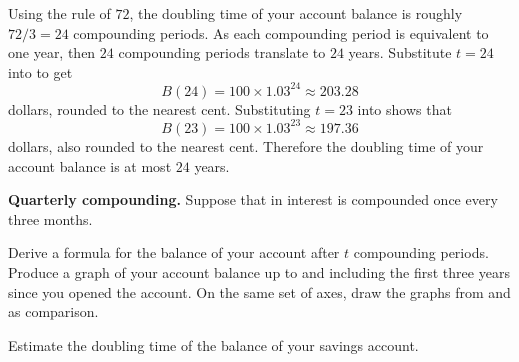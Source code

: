 \documentclass[a4paper,oneside,12pt]{article}
\begin{document}
{\begin{solution}
Using the rule of $72$, the doubling time of your account balance is
roughly $72 / 3 = 24$ compounding periods.  As each compounding period
is equivalent to one year, then $24$ compounding periods translate to
$24$ years.  Substitute $t = 24$ into
 to get
\[
B(24)
=
100 \times 1.03^{24}
\approx
203.28
\]
dollars, rounded to the nearest cent.  Substituting $t = 23$ into
 shows that
\[
B(23)
=
100 \times 1.03^{23}
\approx
197.36
\]
dollars, also rounded to the nearest cent.  Therefore the doubling
time of your account balance is at most $24$ years.
\end{solution}
}{}

\begin{example}
\label{eg:savings_quarterly_compounding}
\textbf{Quarterly compounding.}
Suppose that in  interest is compounded
once every three months.
\begin{packedenum}
\item\label{subeg:savings_quarterly_formula}
  Derive a formula for the balance of your account after $t$
  compounding periods.  Produce a graph of your account balance up to
  and including the first three years since you opened the account.
  On the same set of axes, draw the graphs from
  and
  as comparison.

\item\label{subeg:savings_quarterly_doubling_time}
  Estimate the doubling time of the balance of your savings account.
\end{packedenum}
\end{example}
\end{document}
